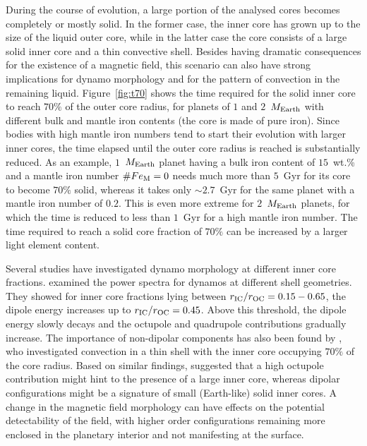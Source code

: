 \documentclass[draft]{agujournal2019} %
\begin{document}
During the course of evolution, a large portion of the analysed cores becomes completely or mostly solid. In the former case, the inner core has grown up to the size of the liquid outer core, while in the latter case the core consists of a large solid inner core and a thin convective shell. Besides having dramatic consequences for the existence of a magnetic field, this scenario can also have strong implications for dynamo morphology and for the pattern of convection in the remaining liquid. Figure~\ref{fig:t70} shows the time required for the solid inner core to reach $70\%$ of the outer core radius, for planets of $1$ and $2$~$M_{\rm Earth}$ with different bulk and mantle iron contents (the core is made of pure iron). Since bodies with high mantle iron numbers tend to start their evolution with larger inner cores, the time elapsed until the outer core radius is reached is substantially reduced. As an example, $1$~$M_{\rm Earth}$ planet having a bulk iron content of $15$~wt.\% and a mantle iron number $\#Fe_{\rm M}=0$ needs much more than $5$~Gyr for its core to become $70\%$ solid, whereas it takes only $\sim 2.7$~Gyr for the same planet with a mantle iron number of $0.2$. This is even more extreme for $2$~$M_{\rm Earth}$ planets, for which the time is reduced to less than $1$~Gyr for a high mantle iron number. The time required to reach a solid core fraction of $70\%$ can be increased by a larger light element content.

Several studies have investigated dynamo morphology at different inner core fractions.  examined the power spectra for dynamos at different shell geometries. They showed for inner core fractions lying between $r_{\rm IC}/r_{\rm OC}=0.15-0.65$, the dipole energy increases up to $r_{\rm IC}/r_{\rm OC}=0.45$. Above this threshold, the dipole energy slowly decays and the octupole and quadrupole contributions gradually increase. 
The importance of non-dipolar components has also been found by , who investigated convection in a thin shell with the inner core occupying $70\%$ of the core radius. Based on similar findings,  suggested that a high octupole contribution might hint to the presence of a large inner core, whereas dipolar configurations might be a signature of small (Earth-like) solid inner cores. A change in the magnetic field morphology can have effects on the potential detectability of the field, with higher order configurations remaining more enclosed in the planetary interior and not manifesting at the surface.
\end{document}
